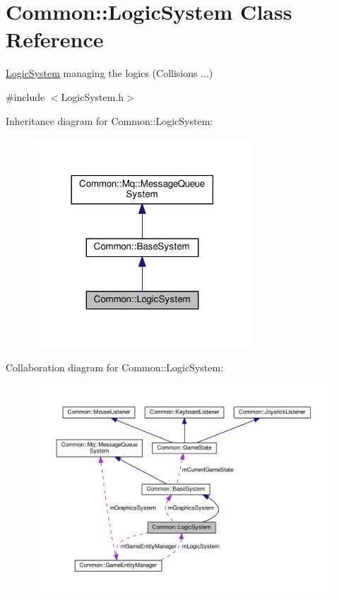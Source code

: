 \hypertarget{class_common_1_1_logic_system}{}\section{Common\+:\+:Logic\+System Class Reference}
\label{class_common_1_1_logic_system}


\hyperlink{class_common_1_1_logic_system}{Logic\+System} managing the logics (Collisions ...)  




{\ttfamily \#include $<$Logic\+System.\+h$>$}



Inheritance diagram for Common\+:\+:Logic\+System\+:\nopagebreak
\begin{figure}[H]
\begin{center}
\leavevmode
\includegraphics[width=230pt]{class_common_1_1_logic_system__inherit__graph}
\end{center}
\end{figure}


Collaboration diagram for Common\+:\+:Logic\+System\+:\nopagebreak
\begin{figure}[H]
\begin{center}
\leavevmode
\includegraphics[width=350pt]{class_common_1_1_logic_system__coll__graph}
\end{center}
\end{figure}
